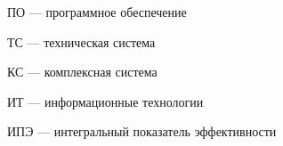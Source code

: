 

\hypertarget{soft}{ПО --- программное обеспечение}















\hypertarget{it}{ТС --- техническая система}

\hypertarget{it}{КС --- комплексная система}

\hypertarget{it}{ИТ --- информационные технологии}

\hypertarget{it}{ИПЭ --- интегральный показатель эффективности}





